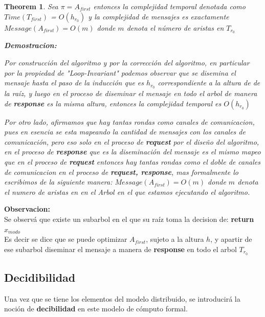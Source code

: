 \documentclass[10pt]{report}
\newtheorem{theorem}{Theorem}
\begin{document}
\begin{theorem}
    Sea $\pi = A_{first}$ entonces la complejidad temporal denotada como $Time(T_{first})$ = $O(h_{r_{0}})$
    y la complejidad de mensajes es exactamente $Message(A_{first}) = O(m)$ donde $m$ denota el número de aristas
    en $T_{r_{0}}$\newline

   \textbf{Demostracion:}
\begin{flushleft}
    Por construcción del algoritmo y por la corrección del algoritmo, en particular por la propiedad de "Loop-Invariant"
    podemos observar que se disemina el mensaje hasta el paso de la inducción que es $h_{r_{0}}$ correspondiente a la altura de
    de la raíz, y luego en el proceso de diseminar el mensaje en todo el arbol de manera de \textbf{response}
    es la misma altura, entonces la complejidad temporal es $O(h_{r_{0}})$

    Por otro lado, afirmamos que hay tantas rondas como canales de comunicacion, pues en esencia se esta mapeando
    la cantidad de mensajes con los canales de comunicación, pero eso solo en el proceso de \textbf{request} por el diseño del
    algoritmo, en el proceso de \textbf{response} que es la diseminación del mensaje es el mismo mapeo que en el proceso
    de \textbf{request} entonces hay tantas rondas como el doble de canales de comunicacion en el proceso de \textbf{request, response},
    mas formalmente lo escribimos de la siguiente manera:
    $Message(A_{first}) = O(m)$ donde $m$ denota el numero de aristas en en el Arbol en el que estamos ejecutando el algoritmo.

\end{flushleft}
\end{theorem}

    \textbf{Observacion:}\\
    Se observá que existe un subarbol en el que su raíz toma la decision de:
    \textbf{return} $x_{modo}$\\
    Es decir se dice que se puede optimizar $A_{first}$, sujeto a la altura $h$, y apartir de ese subarbol diseminar
    el mensaje a manera de \textbf{response} en todo el arbol $T_{r_{0}}$

    \newpage
    \subsection{Decidibilidad}\label{subsec:decidibilidad}
    Una vez que se tiene los elementos del modelo distribuido, se introducirá la noción de \textbf{decibilidad} en
    este modelo de cómputo formal.
\end{document}
